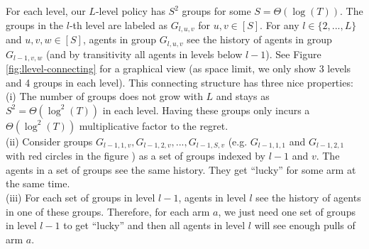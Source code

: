 For each level, our $L$-level policy has $S^2$ groups for some $S = \Theta(\log(T))$. The groups in the $l$-th level are labeled as $G_{l,u,v}$ for $u,v\in[S]$. For any $l \in \{2,...,L\}$ and $u,v,w\in [S]$, agents in group $G_{l,u,v}$ see the history of agents in group $G_{l-1,v,w}$ (and by transitivity all agents in levels below $l-1$). See Figure \ref{fig:llevel-connecting} for a graphical view (as space limit, we only show 3 levels and 4 groups in each level). This connecting structure has three nice properties: \\
(i) The number of groups does not grow with $L$ and stays as $S^2 = \Theta(\log^2(T))$ in each level. Having these groups only incurs a $\Theta(\log^2(T))$ multiplicative factor to the regret.\\
(ii) Consider groups $G_{l-1,1,v},G_{l-1,2,v},...,G_{l-1,S,v}$ (e.g. $G_{l-1,1,1}$ and $G_{l-1,2,1}$ with red circles in the figure ) as a set of groups indexed by $l-1$ and $v$. The agents in a set of groups see the same history. They get ``lucky'' for some arm at the same time.\\
(iii) For each set of groups in level $l-1$, agents in level $l$ see the history of agents in one of these groups. Therefore, for each arm $a$, we just need one set of groups in level $l-1$ to get ``lucky'' and then all agents in level $l$ will see enough pulls of arm $a$. 


